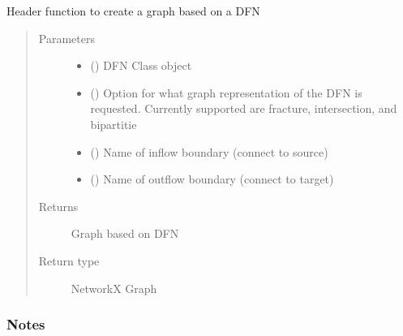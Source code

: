 \documentclass[letterpaper,10pt,english]{sphinxmanual}
\begin{document}
\begin{fulllineitems}
\begin{fulllineitems}
\label{\detokenize{pydfnworks:pydfnworks.general.dfnworks.DFNWORKS.create_graph}}
Header function to create a graph based on a DFN
\begin{quote}\begin{description}
\item[{Parameters}] \leavevmode\begin{itemize}
\item {} 
 () \textendash{} DFN Class object

\item {} 
 () \textendash{} Option for what graph representation of the DFN is requested. Currently supported are fracture, intersection, and bipartitie

\item {} 
 () \textendash{} Name of inflow boundary (connect to source)

\item {} 
 () \textendash{} Name of outflow boundary (connect to target)

\end{itemize}

\item[{Returns}] \leavevmode
{} \textendash{} Graph based on DFN

\item[{Return type}] \leavevmode
NetworkX Graph

\end{description}\end{quote}
\subsubsection*{Notes}

\end{fulllineitems}



\end{fulllineitems}
\end{document}
